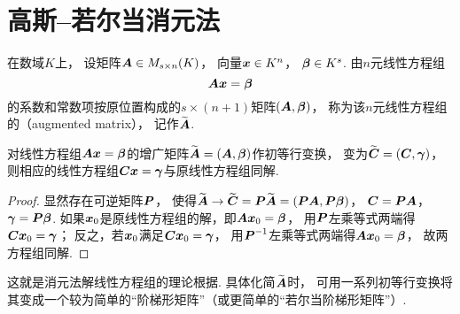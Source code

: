 \section{高斯--若尔当消元法}
\begin{definition}
在数域\(K\)上，
设矩阵\(\boldsymbol{A} \in M_{s \times n}(K)\)，
向量\(\boldsymbol{x} \in K^n\)，
\(\boldsymbol\beta \in K^s\).
由\(n\)元线性方程组\begin{equation*}
	\boldsymbol{A} \boldsymbol{x} = \boldsymbol\beta
\end{equation*}的系数和常数项按原位置构成的\(s \times (n+1)\)矩阵\((\boldsymbol{A},\boldsymbol\beta)\)，
称为该\(n\)元线性方程组的（augmented matrix），
记作\(\widetilde{\boldsymbol{A}}\).
\end{definition}

\begin{theorem}
对线性方程组\(\boldsymbol{A} \boldsymbol{x} = \boldsymbol\beta\)的增广矩阵\(\widetilde{\boldsymbol{A}} = (\boldsymbol{A},\boldsymbol\beta)\)作初等行变换，
变为\(\widetilde{\boldsymbol{C}} = (\boldsymbol{C},\boldsymbol\gamma)\)，
则相应的线性方程组\(\boldsymbol{C} \boldsymbol{x} = \boldsymbol\gamma\)与原线性方程组同解.
\begin{proof}
显然存在可逆矩阵\(\boldsymbol{P}\)，
使得\(\widetilde{\boldsymbol{A}} \to \widetilde{\boldsymbol{C}} = \boldsymbol{P} \widetilde{\boldsymbol{A}} = (\boldsymbol{P}\boldsymbol{A},\boldsymbol{P}\boldsymbol\beta)\)，
\(\boldsymbol{C} = \boldsymbol{P}\boldsymbol{A}\)，\(\boldsymbol\gamma = \boldsymbol{P}\boldsymbol\beta\).
如果\(\boldsymbol{x}_0\)是原线性方程组的解，即\(\boldsymbol{A} \boldsymbol{x}_0 = \boldsymbol\beta\)，
用\(\boldsymbol{P}\)左乘等式两端得\(\boldsymbol{C} \boldsymbol{x}_0 = \boldsymbol\gamma\)；
反之，若\(\boldsymbol{x}_0\)满足\(\boldsymbol{C} \boldsymbol{x}_0 = \boldsymbol\gamma\)，
用\(\boldsymbol{P}^{-1}\)左乘等式两端得\(\boldsymbol{A} \boldsymbol{x}_0 = \boldsymbol\beta\)，
故两方程组同解.
\end{proof}
\end{theorem}
这就是消元法解线性方程组的理论根据.
具体化简\(\widetilde{\boldsymbol{A}}\)时，
可用一系列初等行变换将其变成一个较为简单的“阶梯形矩阵”（或更简单的“若尔当阶梯形矩阵”）.


